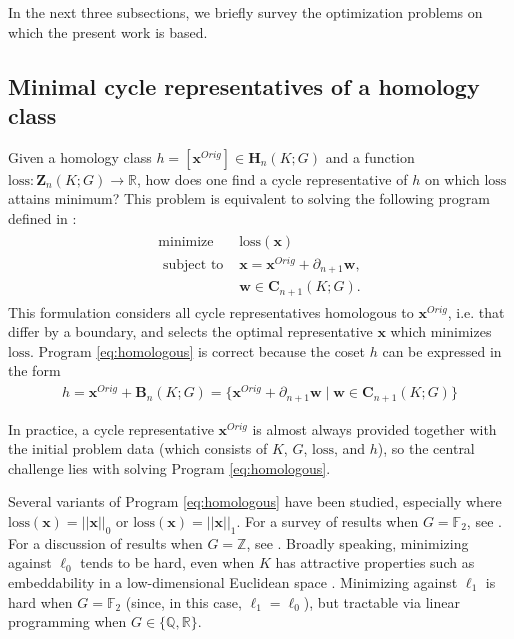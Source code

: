 \documentclass[utf8]{formatting_stuff/frontiersFPHY}
\newcommand{\R}{\mathbb{R}}
\newcommand{\Z}{\mathbb{Z}}
\newcommand{\Q}{\mathbb{Q}}
\newcommand{\field}{\mathbb{F}}
\newcommand{\Chains}{\mathbf{C}}
\newcommand{\Homologies}[0]{\mathbf{H}}
\newcommand{\Boundaries}[0]{\mathbf{B}}
\newcommand{\Cycles}[0]{\mathbf{Z}}
\newcommand{\originalrep}{\mathbf{x}^{Orig}}
\newcommand{\optimalrep}{\mathbf{x}}
\newcommand{\boundingchain}{\mathbf{w}}
\newcommand{\hclass}{h} %
\newcommand{\loss}{\mathrm{loss}}
\newcommand{\pr}{Program }
\theoremstyle{plain}
\theoremstyle{definition}
\begin{document}
 
 
\label{sec:minimalgenerators}

In the next three subsections, we briefly survey the optimization problems on which the present work is based.

\subsection{Minimal cycle representatives of a homology class} \label{singlecyclecase}


Given a homology class $\hclass =[\originalrep] \in \Homologies_n(K; G)$ and a function $\loss: \Cycles_n(K;G) \to \R$, how does one find a cycle representative of $\hclass$ on which $\loss$ attains minimum?  This problem is equivalent to  solving the following program defined in \cite{dey2011optimal}:
\begin{align}
   \begin{split}
    \text{minimize } & \loss(\optimalrep) \\
    \text{ subject to } & \optimalrep = \originalrep + \partial_{n+1} \boundingchain, \\
    & \boundingchain \in \Chains_{n+1}(K; G).
   \end{split}
   \label{eq:homologous}
\end{align}
This formulation considers all cycle representatives homologous to $\originalrep$, i.e. that differ by a boundary, and selects the optimal representative $\optimalrep$ which minimizes $\loss$.
\pr \eqref{eq:homologous} is correct because the coset $\hclass$ can be expressed in the form
    \begin{align*}
    \hclass
    =
    \originalrep + \Boundaries_n(K; G) 
    =
    \{ \originalrep + \partial_{n+1} \boundingchain \mid \boundingchain \in \Chains_{n+1}(K; G) \}
    \end{align*}  
 
In practice, a cycle representative $\originalrep$ is almost always provided together with the initial problem data (which consists of $K$, $G$, $\loss$, and $\hclass$), so the central challenge lies with solving \pr \eqref{eq:homologous}.



Several variants of \pr \eqref{eq:homologous} have been studied, especially where $\loss(\optimalrep) = ||\optimalrep||_0$ or $\loss(\optimalrep) = ||\optimalrep||_1$.  For a survey of results when $G = \field_2$, see \cite{chenhardness}.  For a discussion of results when $G = \Z$, see \cite{dey2011optimal}.  Broadly  speaking, minimizing against $\ell_0$  tends to be hard, even when $K$ has attractive properties such as embeddability in a low-dimensional Euclidean space \cite{borradaile2020minimum}.  Minimizing against $\ell_1$  is hard when $G = \field_2$ (since, in this case, $\ell_1 = \ell_0$),  but tractable via linear programming when $G \in \{\Q, \R\}$.  
\end{document}
